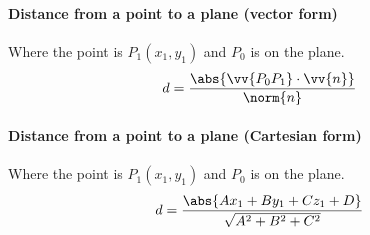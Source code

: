 \paragraph{Distance from a point to a plane (vector form)}
	Where the point is $P_1 (x_1,y_1)$ and $P_0$ is on the plane.
	\begin{equation}
		d = \frac{\abs{\vv{P_0P_1} \cdot \vv{n}}}{\norm{n}}
	\end{equation}
\paragraph{Distance from a point to a plane (Cartesian form)}
	Where the point is $P_1 (x_1,y_1)$ and $P_0$ is on the plane.
	\begin{equation}
		d = \frac{\abs{Ax_1 + By_1 + Cz_1 + D}}{\sqrt{A^2 + B^2 + C^2}}
	\end{equation}
